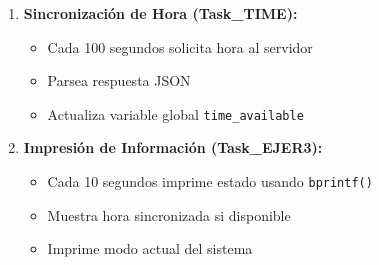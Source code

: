\documentclass[12pt,a4paper]{article}
\begin{document}
\begin{enumerate}
    \item \textbf{Sincronización de Hora (Task\_TIME):}
    \begin{itemize}
        \item Cada 100 segundos solicita hora al servidor
        \item Parsea respuesta JSON
        \item Actualiza variable global \texttt{time\_available}
    \end{itemize}
    
    \item \textbf{Impresión de Información (Task\_EJER3):}
    \begin{itemize}
        \item Cada 10 segundos imprime estado usando \texttt{bprintf()}
        \item Muestra hora sincronizada si disponible
        \item Imprime modo actual del sistema
    \end{itemize}
\end{enumerate}
\end{document}
